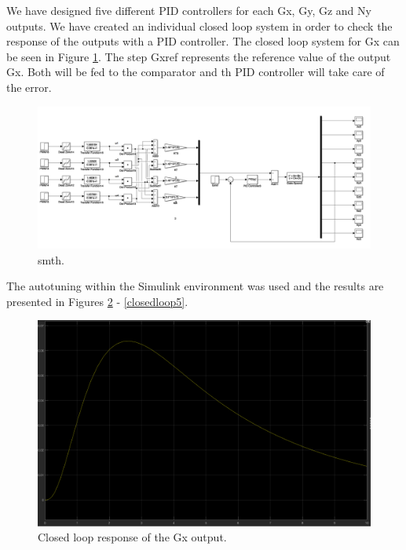 We have designed five different PID controllers for each Gx, Gy, Gz and Ny outputs. We have created an individual closed loop system in order to check the response of the outputs with a PID controller. The closed loop system for Gx can be seen in Figure \ref{closedloop1}. The step Gxref represents the reference value of the output Gx. Both will be fed to the comparator and th PID controller will take care of the error.

\begin{figure}[H]
  \centering
    \includegraphics[width=1\textwidth]{images/closedloopGx.png}
	\caption{smth.}
	\label{closedloop1}
\end{figure}

The autotuning within the Simulink environment was used and the results are presented in Figures \ref{closedloop2} - \ref{closedloop5}.

\begin{figure}[H]
  \centering
    \includegraphics[width=1\textwidth]{images/closedloopGxstep.png}
	\caption{Closed loop response of the Gx output.}
	\label{closedloop2}
\end{figure}

